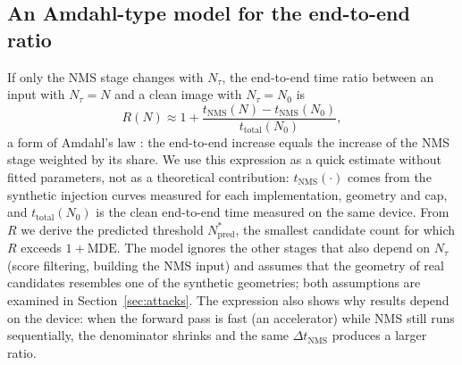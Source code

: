 \documentclass[a4paper,fleqn]{cas-dc}
\newcommand{\Ntau}{N_{\tau}}
\begin{document}
\subsection{An Amdahl-type model for the end-to-end ratio}
\label{sec:amdahl}
If only the NMS stage changes with $\Ntau$, the end-to-end time ratio between an input with $\Ntau = N$ and a clean image with $\Ntau = N_0$ is
\begin{equation}
R(N) \approx 1 + \frac{t_{\mathrm{NMS}}(N) - t_{\mathrm{NMS}}(N_0)}{t_{\mathrm{total}}(N_0)} ,
\end{equation}
a form of Amdahl's law \cite{amdahl1967}: the end-to-end increase equals the increase of the NMS stage weighted by its share. We use this expression as a quick estimate without fitted parameters, not as a theoretical contribution: $t_{\mathrm{NMS}}(\cdot)$ comes from the synthetic injection curves measured for each implementation, geometry and cap, and $t_{\mathrm{total}}(N_0)$ is the clean end-to-end time measured on the same device. From $R$ we derive the predicted threshold $N^{*}_{\mathrm{pred}}$, the smallest candidate count for which $R$ exceeds $1+\mathrm{MDE}$. The model ignores the other stages that also depend on $\Ntau$ (score filtering, building the NMS input) and assumes that the geometry of real candidates resembles one of the synthetic geometries; both assumptions are examined in Section~\ref{sec:attacks}. The expression also shows why results depend on the device: when the forward pass is fast (an accelerator) while NMS still runs sequentially, the denominator shrinks and the same $\Delta t_{\mathrm{NMS}}$ produces a larger ratio.
\end{document}
